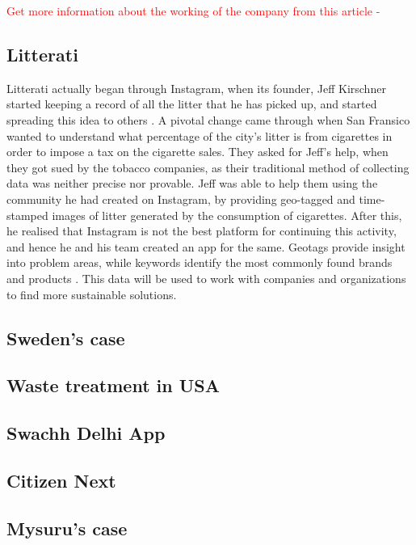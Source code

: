 \documentclass[10pt]{article}
\begin{document}
\textcolor{red}{Get more information about the working of the company from this article - \cite{Paperman:yourStory}}

\subsection{Litterati}

Litterati actually began through Instagram, when its founder, Jeff Kirschner started keeping a record of all the litter that he has picked up, and started spreading this idea to others \citep{Litterati:TED_talk}. A pivotal change came through when San Fransico wanted to understand what percentage of the city's litter is from cigarettes in order to impose a tax on the cigarette sales. They asked for Jeff's help, when they got sued by the tobacco companies, as their traditional method of collecting data was neither precise nor provable. Jeff was able to help them using the community he had created on Instagram, by providing geo-tagged and time-stamped images of litter generated by the consumption of cigarettes. After this, he realised that Instagram is not the best platform for continuing this activity, and hence he and his team created an app for the same.
Geotags provide insight into problem areas, while keywords identify the most commonly found brands and products \citep{Litterati:about}. This data will be used to work with companies and organizations to find more sustainable solutions.

\subsection{Sweden's case}

\subsection{Waste treatment in USA}

\subsection{Swachh Delhi App}

\subsection{Citizen Next}

\subsection{Mysuru's case}
\end{document}
